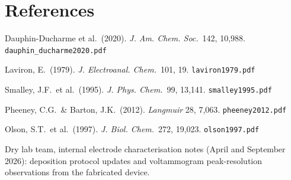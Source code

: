 \documentclass[10pt,a4paper]{article}
\numberwithin{equation}{section}
\begin{document}
\section{References}

\begin{enumerate}[label={[\arabic*]},leftmargin=*]
  \item Dauphin-Ducharme et al.\ (2020). \textit{J. Am. Chem. Soc.}\ 142,
    10,988. \texttt{dauphin\_ducharme2020.pdf}
  \item Laviron, E.\ (1979). \textit{J. Electroanal. Chem.}\ 101, 19.
    \texttt{laviron1979.pdf}
  \item Smalley, J.F.\ et al.\ (1995). \textit{J. Phys. Chem.}\ 99, 13,141.
    \texttt{smalley1995.pdf}
  \item Pheeney, C.G.\ \& Barton, J.K.\ (2012). \textit{Langmuir} 28, 7,063.
    \texttt{pheeney2012.pdf}
  \item Olson, S.T.\ et al.\ (1997). \textit{J. Biol. Chem.}\ 272, 19,023.
    \texttt{olson1997.pdf}
  \item Dry lab team, internal electrode characterisation notes (April and
    September 2026): deposition protocol updates and voltammogram
    peak-resolution observations from the fabricated device.
\end{enumerate}
\end{document}
